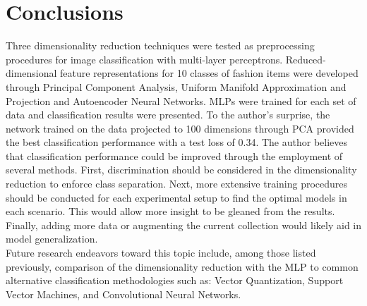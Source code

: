 \documentclass[conference]{IEEEtran}
\begin{document}
\section{Conclusions} \label{Conclusions}
Three dimensionality reduction techniques were tested as preprocessing procedures for image classification with multi-layer perceptrons.  Reduced-dimensional feature representations for 10 classes of fashion items were developed through Principal Component Analysis, Uniform Manifold Approximation and Projection and Autoencoder Neural Networks.  MLPs were trained for each set of data and classification results were presented.  To the author's surprise, the network trained on the data projected to 100 dimensions through PCA provided the best classification performance with a test loss of 0.34.  The author believes that classification performance could be improved through the employment of several methods.  First, discrimination should be considered in the dimensionality reduction to enforce class separation.  Next, more extensive training procedures should be conducted for each experimental setup to find the optimal models in each scenario.  This would allow more insight to be gleaned from the results.  Finally, adding more data or augmenting the current collection would likely aid in model generalization. \\
\indent
Future research endeavors toward this topic include, among those listed previously, comparison of the dimensionality reduction with the MLP to common alternative classification methodologies such as: Vector Quantization, Support Vector Machines, and Convolutional Neural Networks. 
\end{document}
